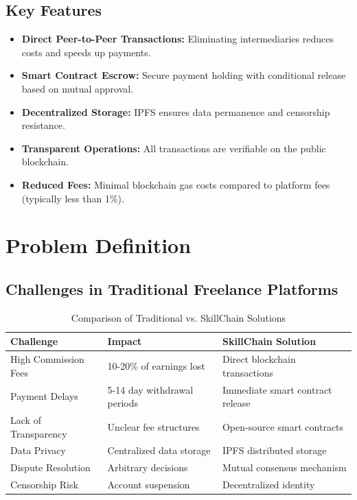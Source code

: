 \subsection{Key Features}

\begin{itemize}[leftmargin=*]
    \item \textbf{Direct Peer-to-Peer Transactions:} Eliminating intermediaries reduces costs and speeds up payments.
    \item \textbf{Smart Contract Escrow:} Secure payment holding with conditional release based on mutual approval.
    \item \textbf{Decentralized Storage:} IPFS ensures data permanence and censorship resistance.
    \item \textbf{Transparent Operations:} All transactions are verifiable on the public blockchain.
    \item \textbf{Reduced Fees:} Minimal blockchain gas costs compared to platform fees (typically less than 1\%).
\end{itemize}

\section{Problem Definition}

\subsection{Challenges in Traditional Freelance Platforms}

\begin{table}[H]
\centering
\caption{Comparison of Traditional vs. SkillChain Solutions}
\label{tab:challenges}
\begin{tabular}{|p{3.5cm}|p{4cm}|p{5cm}|}
\hline
\textbf{Challenge} & \textbf{Impact} & \textbf{SkillChain Solution} \\
\hline
High Commission Fees & 10-20\% of earnings lost & Direct blockchain transactions \\
\hline
Payment Delays & 5-14 day withdrawal periods & Immediate smart contract release \\
\hline
Lack of Transparency & Unclear fee structures & Open-source smart contracts \\
\hline
Data Privacy & Centralized data storage & IPFS distributed storage \\
\hline
Dispute Resolution & Arbitrary decisions & Mutual consensus mechanism \\
\hline
Censorship Risk & Account suspension & Decentralized identity \\
\hline
\end{tabular}
\end{table}

